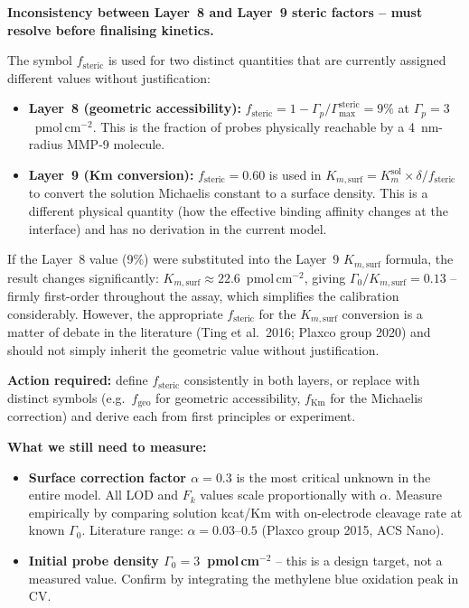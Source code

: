\documentclass[10pt,a4paper]{article}
\newenvironment{findingbox}{%
  \begin{lrbox}{\tmpbox}\begin{minipage}{0.965\textwidth}\vspace{0.2em}}%
 {\vspace{0.2em}\end{minipage}\end{lrbox}%
  \par\vspace{0.4em}\noindent\colorbox{boxgreen}{\usebox{\tmpbox}}\par\vspace{0.4em}}
\newenvironment{needsbox}{%
  \begin{lrbox}{\tmpbox}\begin{minipage}{0.965\textwidth}\vspace{0.2em}%
  \textbf{\textcolor{ambertext}{What we still need to measure:}}\par\vspace{0.15em}}%
 {\vspace{0.2em}\end{minipage}\end{lrbox}%
  \par\vspace{0.4em}\noindent\colorbox{boxamber}{\usebox{\tmpbox}}\par\vspace{0.4em}}
\begin{document}
\begin{findingbox}
\textbf{Inconsistency between Layer~8 and Layer~9 steric factors -- must resolve before finalising kinetics.}

The symbol $f_\text{steric}$ is used for two distinct quantities that are currently assigned
different values without justification:

\begin{itemize}[noitemsep, topsep=3pt]
\item \textbf{Layer~8 (geometric accessibility):} $f_\text{steric} = 1 - \Gamma_p/\Gamma_\text{max}^\text{steric} = 9\%$
  at $\Gamma_p = 3$~pmol\,cm$^{-2}$. This is the fraction of probes physically reachable by a
  4~nm-radius MMP-9 molecule.
\item \textbf{Layer~9 (Km conversion):} $f_\text{steric} = 0.60$ is used in
  $K_{m,\text{surf}} = K_m^\text{sol} \times \delta / f_\text{steric}$ to convert the solution Michaelis
  constant to a surface density. This is a different physical quantity (how the effective binding
  affinity changes at the interface) and has no derivation in the current model.
\end{itemize}

If the Layer~8 value (9\%) were substituted into the Layer~9 $K_{m,\text{surf}}$ formula, the result
changes significantly: $K_{m,\text{surf}} \approx 22.6$~pmol\,cm$^{-2}$, giving
$\Gamma_0/K_{m,\text{surf}} = 0.13$ -- firmly first-order throughout the assay, which simplifies the
calibration considerably. However, the appropriate $f_\text{steric}$ for the $K_{m,\text{surf}}$
conversion is a matter of debate in the literature (Ting et al.\ 2016; Plaxco group 2020) and
should not simply inherit the geometric value without justification.

\textbf{Action required:} define $f_\text{steric}$ consistently in both layers, or replace with
distinct symbols (e.g.\ $f_\text{geo}$ for geometric accessibility, $f_\text{Km}$ for the
Michaelis correction) and derive each from first principles or experiment.
\end{findingbox}

\begin{needsbox}
\begin{itemize}[noitemsep, topsep=2pt]
\item \textbf{Surface correction factor $\alpha = 0.3$} is the most critical unknown in the
  entire model. All LOD and $F_k$ values scale proportionally with $\alpha$. Measure
  empirically by comparing solution kcat/Km with on-electrode cleavage rate at known $\Gamma_0$.
  Literature range: $\alpha = 0.03$--$0.5$ (Plaxco group 2015, ACS Nano).
\item \textbf{Initial probe density $\Gamma_0 = 3$~pmol\,cm$^{-2}$} -- this is a design target,
  not a measured value. Confirm by integrating the methylene blue oxidation peak in CV.
\end{itemize}
\end{needsbox}
\end{document}
